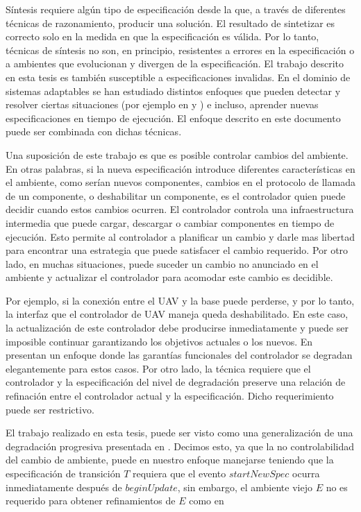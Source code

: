 Síntesis requiere algún tipo de especificación desde la que, a través de diferentes técnicas de razonamiento, producir
una solución. El resultado de sintetizar es correcto solo en la medida en que la especificación es válida. Por lo tanto,
técnicas de síntesis no son, en principio, resistentes a errores en la especificación o a ambientes que evolucionan y
divergen de la especificación. El trabajo descrito en esta tesis es también susceptible a especificaciones invalidas. En
el dominio de sistemas adaptables se han estudiado distintos enfoques que pueden detectar y resolver ciertas situaciones
(por ejemplo en \cite{DBKMSU14} y \cite{Vromant:2011:ICL:1988008.1988037}) e incluso, aprender nuevas especificaciones
en tiempo de ejecución. El enfoque descrito en este documento puede ser combinada con dichas técnicas.

Una suposición de este trabajo es que es posible controlar cambios del ambiente. En otras palabras, si la nueva
especificación introduce diferentes características en el ambiente, como serían nuevos componentes, cambios en el protocolo
de llamada de un componente, o deshabilitar un componente, es el controlador quien puede decidir cuando estos cambios
ocurren. El controlador controla una infraestructura intermedia que puede cargar, descargar o cambiar componentes en
tiempo de ejecución. Esto permite al controlador a planificar un cambio y darle mas libertad para encontrar una
estrategia que puede satisfacer el cambio requerido. Por otro lado, en muchas situaciones, puede suceder un cambio no
anunciado en el ambiente y actualizar el controlador para acomodar este cambio es decidible.

Por ejemplo, si la conexión entre el UAV y la base puede perderse, y por lo tanto, la interfaz que el controlador de UAV
maneja queda deshabilitado. En este caso, la actualización de este controlador debe producirse inmediatamente y puede
ser imposible continuar garantizando los objetivos actuales o los nuevos. En \cite{DBKMSU14} presentan un enfoque donde las
garantías funcionales del controlador se degradan elegantemente para estos casos. Por otro lado, la técnica requiere que
el controlador y la especificación del nivel de degradación preserve una relación de refinación entre el controlador
actual y la especificación. Dicho requerimiento puede ser restrictivo.

El trabajo realizado en esta tesis, puede ser visto como una generalización de una degradación progresiva presentada en
\cite{DBKMSU14}. Decimos esto, ya que la no controlabilidad del cambio de ambiente, puede en nuestro enfoque manejarse teniendo
que la especificación de transición $T$ requiera que el evento $startNewSpec$ ocurra inmediatamente después de
$beginUpdate$, sin embargo, el ambiente viejo $E$ no es requerido para obtener refinamientos de $E$ como en
\cite{DBKMSU14}

